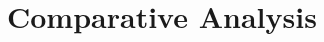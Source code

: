 \documentclass[10pt,aspectratio=169]{beamer}
\newcommand{\greenoplus}{\textcolor{mygreen}{\ding{51}}}
\newcommand{\redominus}{\textcolor{myred}{\ding{55}}}
\begin{document}


\section{Comparative Analysis}
\end{document}

